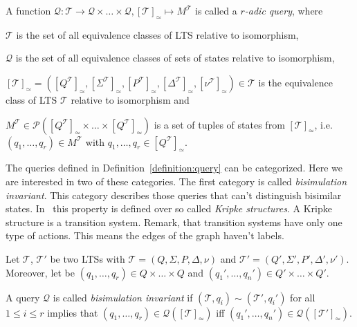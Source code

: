 \begin{definition}
    \label{definition:query}
    A function $\mathcal{Q} : \mathscr{T} \rightarrow \mathscr{Q} \times \dots \times \mathscr{Q}, [\mathcal{T}]_\simeq
    \mapsto M^{\mathcal{T}}$ is called a
    \emph{$r$-adic query},
    where
    \begin{compactitem}
        \item $\mathscr{T}$ is the set of all equivalence classes of LTS relative to isomorphism,
        \item $\mathscr{Q}$ is the set of all equivalence classes of sets of states relative to isomorphism,
        \item $[\mathcal{T}]_\simeq = ([Q^\mathcal{T}]_\simeq, [\Sigma^\mathcal{T}]_\simeq, [P^\mathcal{T}]_\simeq,
        [\Delta^\mathcal{T}]_\simeq, [\nu^\mathcal{T}]_\simeq) \in \mathscr{T}$ is the equivalence class of LTS
        $\mathcal{T}$ relative to isomorphism and
        \item $M^{\mathcal{T}} \in \mathcal{P}([Q^\mathcal{T}]_\simeq \times \dots \times [Q^\mathcal{T}]_\simeq)$ is a
        set of tuples of states from $[\mathcal{T}]_\simeq$, i.e. $(q_1, \dots, q_r) \in M^{\mathcal{T}}$ with $q_1,
        \dots, q_r \in [Q^\mathcal{T}]_\simeq$.
    \end{compactitem}
\end{definition}

The queries defined in Definition~\ref{definition:query} can be categorized. Here we are interested in two of these
categories. The first category is called \textit{bisimulation invariant}. This category describes those queries that
can't distinguish bisimilar states. In~\cite{otto1999bisimulation} this property is defined over so called
\textit{Kripke structures}. A Kripke structure
is a transition system. Remark, that transition systems  have only one type of actions. This means the edges of the
graph haven't labels.

\begin{definition}
    \label{definition:bisimulationInvariant}
    Let $\mathcal{T}$, $\mathcal{T}'$ be two LTSs with $\mathcal{T} = (Q, \Sigma, P, \Delta, \nu)$
    and $\mathcal{T}' = (Q', \Sigma', P', \Delta', \nu')$. Moreover, let be $(q_1, \dots, q_r) \in Q \times \dots
    \times Q$ and $({q_1}', \dots, {q_n}') \in Q' \times \dots \times Q'$.

    A query $\mathcal{Q}$ is called \emph{bisimulation invariant} if $(\mathcal{T}, q_i) \sim (\mathcal{T}', q_i')$
    for all $1 \leq i \leq r$ implies that $(q_1, \dots, q_r) \in \mathcal{Q}([\mathcal{T}]_\simeq)$ iff $({q_1}',
    \dots, {q_n}') \in \mathcal{Q}([\mathcal{T}']_\simeq)$.
\end{definition}

